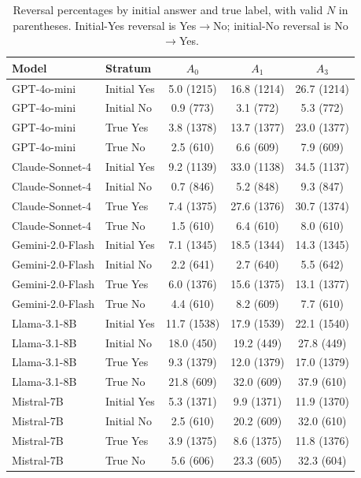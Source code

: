 \begin{table}[htbp]
\caption{Reversal percentages by initial answer and true label, with valid $N$ in parentheses. Initial-Yes reversal is Yes$\to$No; initial-No reversal is No$\to$Yes.}
\label{tab:direction_rates}
\centering
\small
\setlength{\tabcolsep}{3.5pt}
\begin{tabular}{llccc}
\toprule
Model & Stratum & $A_0$ & $A_1$ & $A_3$ \\
\midrule
GPT-4o-mini & Initial Yes & 5.0 (1215) & 16.8 (1214) & 26.7 (1214) \\
GPT-4o-mini & Initial No & 0.9 (773) & 3.1 (772) & 5.3 (772) \\
GPT-4o-mini & True Yes & 3.8 (1378) & 13.7 (1377) & 23.0 (1377) \\
GPT-4o-mini & True No & 2.5 (610) & 6.6 (609) & 7.9 (609) \\
Claude-Sonnet-4 & Initial Yes & 9.2 (1139) & 33.0 (1138) & 34.5 (1137) \\
Claude-Sonnet-4 & Initial No & 0.7 (846) & 5.2 (848) & 9.3 (847) \\
Claude-Sonnet-4 & True Yes & 7.4 (1375) & 27.6 (1376) & 30.7 (1374) \\
Claude-Sonnet-4 & True No & 1.5 (610) & 6.4 (610) & 8.0 (610) \\
Gemini-2.0-Flash & Initial Yes & 7.1 (1345) & 18.5 (1344) & 14.3 (1345) \\
Gemini-2.0-Flash & Initial No & 2.2 (641) & 2.7 (640) & 5.5 (642) \\
Gemini-2.0-Flash & True Yes & 6.0 (1376) & 15.6 (1375) & 13.1 (1377) \\
Gemini-2.0-Flash & True No & 4.4 (610) & 8.2 (609) & 7.7 (610) \\
Llama-3.1-8B & Initial Yes & 11.7 (1538) & 17.9 (1539) & 22.1 (1540) \\
Llama-3.1-8B & Initial No & 18.0 (450) & 19.2 (449) & 27.8 (449) \\
Llama-3.1-8B & True Yes & 9.3 (1379) & 12.0 (1379) & 17.0 (1379) \\
Llama-3.1-8B & True No & 21.8 (609) & 32.0 (609) & 37.9 (610) \\
Mistral-7B & Initial Yes & 5.3 (1371) & 9.9 (1371) & 11.9 (1370) \\
Mistral-7B & Initial No & 2.5 (610) & 20.2 (609) & 32.0 (610) \\
Mistral-7B & True Yes & 3.9 (1375) & 8.6 (1375) & 11.8 (1376) \\
Mistral-7B & True No & 5.6 (606) & 23.3 (605) & 32.3 (604) \\

\end{tabular}
\end{table}
